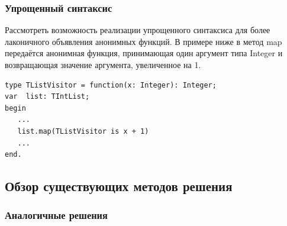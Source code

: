 \documentclass{imcs}
\begin{document}

\subsubsection{Упрощенный синтаксис}
Рассмотреть возможность реализации упрощенного синтаксиса для более лаконичного объявления
анонимных функций. В примере ниже в метод map передаётся анонимная функция, принимающая
один аргумент типа Integer и возвращающая значение аргумента, увеличенное на 1.
\begin{lstlisting}
type TListVisitor = function(x: Integer): Integer;
var  list: TIntList;
begin
   ...
   list.map(TListVisitor is x + 1)
   ...
end.
\end{lstlisting}
\fi

\subsection{Обзор существующих методов решения}

\subsubsection{Аналогичные решения}

\end{document}
